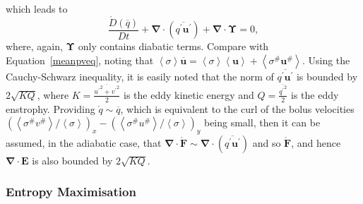 \documentclass[10pt,a4paper]{article}
\newcommand*\thkmean[1]{\overline{#1}}
\newcommand*\thkres[1]{{#1}^{\prime}}
\newcommand*\nthkmean[1]{\left\langle{#1}\right\rangle}
\newcommand*\nthkres[1]{{#1}^{\#}}
\newcommand*\spec[1]{\mathring{#1}}
\newcommand*\equref[1]{Equation~\ref{#1}}
\begin{document}
                      which leads  to
                      \begin{equation}
                      \frac{\spec{D} \left( \thkmean{q}\right)}{D t}
                      + \boldsymbol{\nabla}\cdot\left(\thkmean{\thkres{q} \thkres{\boldsymbol{u}}}\right)
                      +\boldsymbol{\nabla}\cdot\boldsymbol{\Upsilon}=0 ,
                      \end{equation}
                      where, again, $\boldsymbol{\Upsilon}$ only contains
                      diabatic terms. Compare with \equref{meanpveq}, noting that
                       ${\nthkmean{\sigma}\thkmean{\boldsymbol{u}}=\nthkmean{\sigma}\nthkmean{\boldsymbol{u}} + \nthkmean{\nthkres{\sigma}\nthkres{\boldsymbol{u}}}}$.
                       Using the Cauchy-Schwarz inequality, it is easily noted that
                       the norm of $\thkmean{\thkres{q} \thkres{\boldsymbol{u}}}$ is bounded
                       by $2\sqrt{KQ}$, where $K = \frac{\thkmean{{\thkres{u}}^{2} +
                       	{\thkres{v}}^{2}}}{2}$ is the eddy kinetic energy and $Q =
                        \frac{\thkmean{{\thkres{q}}^{2}}}{2}$ is the eddy enstrophy.
                       Providing $\spec{q} \sim \thkmean{q}$, which is equivalent 
                       to the  curl of the bolus velocities $\left(\nthkmean{\nthkres{\sigma}\nthkres{v}}/\nthkmean{\sigma}\right)_{x}-\left(\nthkmean{\nthkres{\sigma}\nthkres{u}}/\nthkmean{\sigma}\right)_{y}$ 
                       being small, then it can be assumed, in the adiabatic case,
                       that $\boldsymbol{\nabla}\cdot\spec{\boldsymbol{F}} \sim \boldsymbol{\nabla}\cdot\left(\thkmean{\thkres{q} \thkres{\boldsymbol{u}}}\right)$ and so $\spec{\boldsymbol{F}}$,
                       and hence $\boldsymbol{\nabla}\cdot\boldsymbol{E}$
                       is also bounded by  $2\sqrt{KQ}$.
                       
                       
                      
                      
                      
                      
                      
                      \subsubsection{Entropy  Maximisation}
                      \label{entropy}
                     
\end{document}
